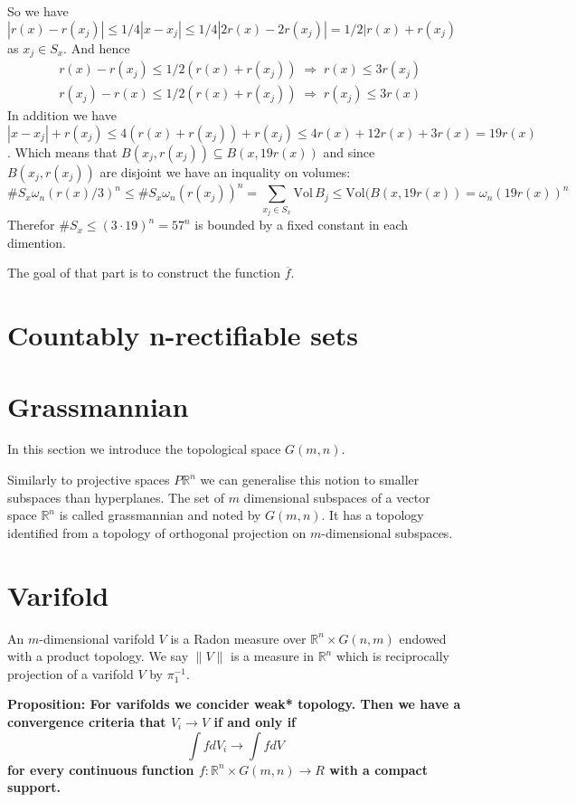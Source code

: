 \documentclass{article}
\begin{document}
So we have $|r(x)-r(x_j)| \leq 1/4|x-x_j|\leq1/4|2r(x)-2r(x_j)|=1/2|r(x)+r(x_j)$
as $x_j\in S_x$. And hence
\[
\begin{aligned}
    &r(x)-r(x_j)\leq1/2(r(x)+r(x_j))\;\Rightarrow\;r(x)\leq 3r(x_j)\\
    &r(x_j)-r(x)\leq1/2(r(x)+r(x_j))\;\Rightarrow\;r(x_j)\leq 3r(x)
\end{aligned}
\]
In addition we have $|x-x_j|+r(x_j)\leq4(r(x)+r(x_j))+r(x_j)\leq4r(x)+12r(x)+3r(x)=
19r(x)$. Which means that $B(x_j, r(x_j))\subseteq B(x, 19r(x))$ and since
$B(x_j, r(x_j))$ are disjoint we have an inquality on volumes:
\[
    \#S_x\omega_n(r(x)/3)^n\leq\#S_x\omega_n(r(x_j))^n=\sum_{x_j\in S_x}\text{Vol}
    \,B_j\leq\text{Vol}(B(x,19r(x))=\omega_n(19r(x))^n
\]
Therefor $\#S_x\leq(3\cdot19)^n=57^n$ is bounded by a fixed constant in each
dimention.

\vspace{1ex}
The goal of that part is to construct the function $\overline f$.

\section{Countably n-rectifiable sets}


\section{Grassmannian}

In this section we introduce the topological space $G(m,n)$.
\vspace{1ex}

Similarly to projective spaces $P\mathbb{R}^n$ we can generalise this notion to
smaller subspaces than hyperplanes. The set of $m$ dimensional subspaces of a
vector space $\mathbb{R}^n$ is called grassmannian and noted by $G(m,n)$. It
has a topology identified from a topology of orthogonal projection on
$m$-dimensional subspaces.

\section{Varifold}

An $m$-dimensional varifold $V$ is a Radon measure over $\mathbb{R}^n\times
G(n,m)$ endowed with a product topology. We say $\|V\|$ is a measure in
$\mathbb{R}^n$ which is reciprocally projection of a varifold $V$ by $\pi_1^{-1}$.

\textbf{Proposition: For varifolds we concider weak* topology. Then we have a
convergence criteria that $V_i\rightarrow V$ if and only if
\[\int fdV_i\rightarrow\int fdV\]
for every continuous function $f:\mathbb{R}^n\times G(m,n)\rightarrow R$ with a
compact support.}
\vspace{1ex}
\end{document}
